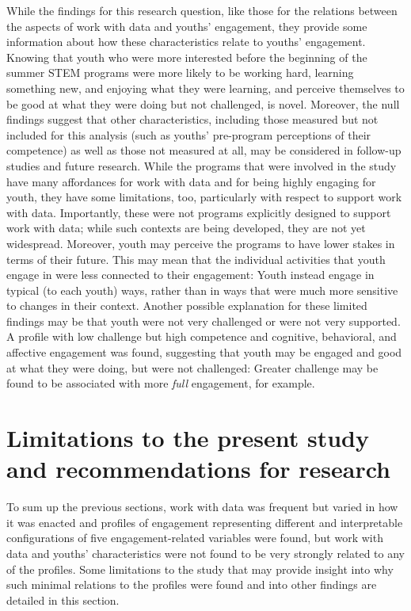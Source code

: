 \documentclass[]{msu-thesis}
\theoremstyle{definition}
\theoremstyle{definition}
\theoremstyle{definition}
\theoremstyle{remark}
\begin{document}
While the findings for this research question, like those for the
relations between the aspects of work with data and youths' engagement,
they provide some information about how these characteristics relate to
youths' engagement. Knowing that youth who were more interested before
the beginning of the summer STEM programs were more likely to be working
hard, learning something new, and enjoying what they were learning, and
perceive themselves to be good at what they were doing but not
challenged, is novel. Moreover, the null findings suggest that other
characteristics, including those measured but not included for this
analysis (such as youths' pre-program perceptions of their competence)
as well as those not measured at all, may be considered in follow-up
studies and future research. While the programs that were involved in
the study have many affordances for work with data and for being highly
engaging for youth, they have some limitations, too, particularly with
respect to support work with data. Importantly, these were not programs
explicitly designed to support work with data; while such contexts are
being developed, they are not yet widespread. Moreover, youth may
perceive the programs to have lower stakes in terms of their future.
This may mean that the individual activities that youth engage in were
less connected to their engagement: Youth instead engage in typical (to
each youth) ways, rather than in ways that were much more sensitive to
changes in their context. Another possible explanation for these limited
findings may be that youth were not very challenged or were not very
supported. A profile with low challenge but high competence and
cognitive, behavioral, and affective engagement was found, suggesting
that youth may be engaged and good at what they were doing, but were not
challenged: Greater challenge may be found to be associated with more
\emph{full} engagement, for example.

\section{Limitations to the present study and recommendations for
research}\label{limitations-to-the-present-study-and-recommendations-for-research}

To sum up the previous sections, work with data was frequent but varied
in how it was enacted and profiles of engagement representing different
and interpretable configurations of five engagement-related variables
were found, but work with data and youths' characteristics were not
found to be very strongly related to any of the profiles. Some
limitations to the study that may provide insight into why such minimal
relations to the profiles were found and into other findings are
detailed in this section.
\end{document}
